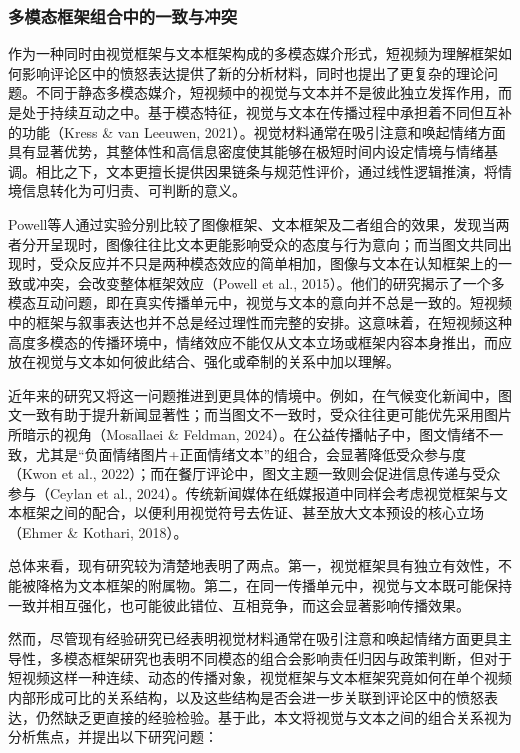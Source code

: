 \documentclass[
]{article}
\begin{document}
\subsubsection{多模态框架组合中的一致与冲突}\label{ux591aux6a21ux6001ux6846ux67b6ux7ec4ux5408ux4e2dux7684ux4e00ux81f4ux4e0eux51b2ux7a81}

作为一种同时由视觉框架与文本框架构成的多模态媒介形式，短视频为理解框架如何影响评论区中的愤怒表达提供了新的分析材料，同时也提出了更复杂的理论问题。不同于静态多模态媒介，短视频中的视觉与文本并不是彼此独立发挥作用，而是处于持续互动之中。基于模态特征，视觉与文本在传播过程中承担着不同但互补的功能（Kress
\& van Leeuwen,
2021）。视觉材料通常在吸引注意和唤起情绪方面具有显著优势，其整体性和高信息密度使其能够在极短时间内设定情境与情绪基调。相比之下，文本更擅长提供因果链条与规范性评价，通过线性逻辑推演，将情境信息转化为可归责、可判断的意义。

Powell等人通过实验分别比较了图像框架、文本框架及二者组合的效果，发现当两者分开呈现时，图像往往比文本更能影响受众的态度与行为意向；而当图文共同出现时，受众反应并不只是两种模态效应的简单相加，图像与文本在认知框架上的一致或冲突，会改变整体框架效应（Powell
et al.,
2015）。他们的研究揭示了一个多模态互动问题，即在真实传播单元中，视觉与文本的意向并不总是一致的。短视频中的框架与叙事表达也并不总是经过理性而完整的安排。这意味着，在短视频这种高度多模态的传播环境中，情绪效应不能仅从文本立场或框架内容本身推出，而应放在视觉与文本如何彼此结合、强化或牵制的关系中加以理解。

近年来的研究又将这一问题推进到更具体的情境中。例如，在气候变化新闻中，图文一致有助于提升新闻显著性；而当图文不一致时，受众往往更可能优先采用图片所暗示的视角（Mosallaei
\& Feldman,
2024）。在公益传播帖子中，图文情绪不一致，尤其是``负面情绪图片+正面情绪文本''的组合，会显著降低受众参与度（Kwon
et al.,
2022）；而在餐厅评论中，图文主题一致则会促进信息传递与受众参与（Ceylan
et al.,
2024）。传统新闻媒体在纸媒报道中同样会考虑视觉框架与文本框架之间的配合，以便利用视觉符号去佐证、甚至放大文本预设的核心立场（Ehmer
\& Kothari, 2018）。

总体来看，现有研究较为清楚地表明了两点。第一，视觉框架具有独立有效性，不能被降格为文本框架的附属物。第二，在同一传播单元中，视觉与文本既可能保持一致并相互强化，也可能彼此错位、互相竞争，而这会显著影响传播效果。

然而，尽管现有经验研究已经表明视觉材料通常在吸引注意和唤起情绪方面更具主导性，多模态框架研究也表明不同模态的组合会影响责任归因与政策判断，但对于短视频这样一种连续、动态的传播对象，视觉框架与文本框架究竟如何在单个视频内部形成可比的关系结构，以及这些结构是否会进一步关联到评论区中的愤怒表达，仍然缺乏更直接的经验检验。基于此，本文将视觉与文本之间的组合关系视为分析焦点，并提出以下研究问题：
\end{document}
